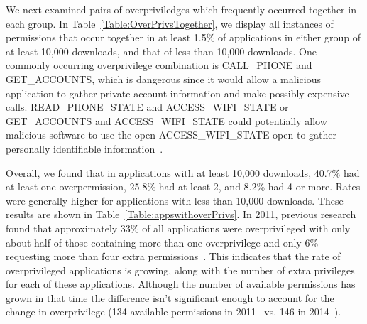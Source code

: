 \documentclass[conference]{IEEEtran}
\begin{document}
We next examined pairs of overpriviledges which frequently occurred together in each group. In Table~\ref{Table:OverPrivsTogether}, we display all instances of permissions that occur together in at least 1.5\% of applications in either group of at least 10,000 downloads, and that of less than 10,000 downloads. One commonly occurring overprivilege combination is CALL\_PHONE and GET\_ACCOUNTS, which is dangerous since it would allow a malicious application to gather private account information and make possibly expensive calls. READ\_PHONE\_STATE and ACCESS\_WIFI\_STATE or GET\_ACCOUNTS and ACCESS\_WIFI\_STATE could potentially allow malicious software to use the open ACCESS\_WIFI\_STATE open to gather personally identifiable information~\cite{Achara:2014:SPW:2627393.2627399}.




Overall, we found that in applications with at least 10,000 downloads, 40.7\% had at least one overpermission, 25.8\% had at least 2, and 8.2\% had 4 or more. Rates were generally higher for applications with less than 10,000 downloads. These results are shown in Table~\ref{Table:appswithoverPrivs}. In 2011, previous research found that approximately 33\% of all applications were overprivileged with only about half of those containing more than one overprivilege and only 6\% requesting more than four extra permissions~\cite{Felt:2011:APD:2046707.2046779}. This indicates that the rate of overprivileged applications is growing, along with the number of extra privileges for each of these applications. Although the number of available permissions has grown in that time the difference isn't significant enough to account for the change in overprivilege (134 available permissions in 2011~\cite{Felt:2011:APD:2046707.2046779} vs. 146 in 2014~\cite{manifestpermission}).
\end{document}
